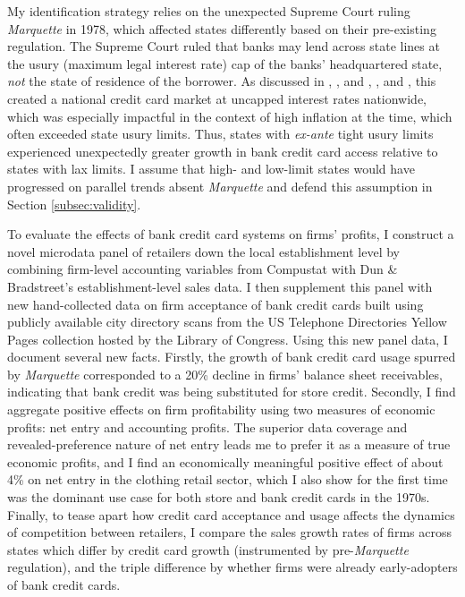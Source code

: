 \documentclass[12pt,english]{article}
\begin{document}
My identification strategy relies on the unexpected Supreme Court ruling \emph{Marquette} in 1978, which affected states differently based on their pre-existing regulation. The Supreme Court ruled that banks may lend across state lines at the usury (maximum legal interest rate) cap of the banks' headquartered state, \emph{not} the state of residence of the borrower. As discussed in \cite{zinman_impact_2003}, \cite{chatterji_entrepreneurial_2012}, and \cite{herkenhoff_who_2020}, \cite{nocera_piece_2013}, and \cite{hyman_borrow_2012}, this created a national credit card market at uncapped interest rates nationwide, which was especially impactful in the context of high inflation at the time, which often exceeded state usury limits. Thus, states with \emph{ex-ante} tight usury limits experienced unexpectedly greater growth in bank credit card access relative to states with lax limits. I assume that high- and low-limit states would have progressed on parallel trends absent \emph{Marquette} and defend this assumption in Section \ref{subsec:validity}. 

To evaluate the effects of bank credit card systems on firms' profits, I construct a novel microdata panel of retailers down the local establishment level by combining firm-level accounting variables from Compustat with Dun \& Bradstreet's establishment-level sales data. I then supplement this panel with new hand-collected data on firm acceptance of bank credit cards built using publicly available city directory scans from the US Telephone Directories Yellow Pages collection hosted by the Library of Congress. Using this new panel data, I document several new facts. Firstly, the growth of bank credit card usage spurred by \emph{Marquette} corresponded to a 20\% decline in firms' balance sheet receivables, indicating that bank credit was being substituted for store credit. Secondly, I find aggregate positive effects on firm profitability using two measures of economic profits: net entry and accounting profits. The superior data coverage and revealed-preference nature of net entry leads me to prefer it as a measure of true economic profits, and I find an economically meaningful positive effect of about 4\% on net entry in the clothing retail sector, which I also show for the first time was the dominant use case for both store and bank credit cards in the 1970s. Finally, to tease apart how credit card acceptance and usage affects the dynamics of competition between retailers, I compare the sales growth rates of firms across states which differ by credit card growth (instrumented by pre-\emph{Marquette} regulation), and the triple difference by whether firms were already early-adopters of bank credit cards. %
\end{document}
